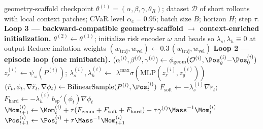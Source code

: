 \begin{algorithm}[t]
\caption{Context-aware continual Hamiltonian learning (training; Loops 2 \& 3)}
\label{alg:ctx_train}
\begin{algorithmic}[1]
\Require geometry-scaffold checkpoint $\theta^{(1)} = (\alpha,\beta,\gamma,\theta_R)$;
         dataset $\mathcal{D}$ of short rollouts with local context
         patches; CVaR level $\alpha_c{=}0.95$; batch size $B$;
         horizon $H$; step $\tau$.
\Statex \textbf{Loop 3 — backward-compatible geometry-scaffold $\to$ context-enriched initialization.}
\State $\theta^{(2)} \leftarrow \theta^{(1)}$; initialize risk encoder
        $\omega$ and heads so $\lambda_s, \lambda_h \equiv 0$ at output
\State Reduce imitation weights $(w_{\mathrm{traj}}, w_{\mathrm{vel}})
        \leftarrow 0.3\,(w_{\mathrm{traj}}, w_{\mathrm{vel}})$
  \Statex \hspace{0.7em}\textbf{Loop 2 — episode loop (one minibatch).}
    \State $(\alpha^{(i)},\beta^{(i)},\gamma^{(i)})
            \leftarrow \phi_{\mathrm{geom}}(\mathcal{O}^{(i)},
                       \Pos_g^{(i)}{-}\Pos_0^{(i)})$
    \State $z_r^{(i)} \leftarrow \psi_\omega(P^{(i)})$;\;
           $\lambda_s^{(i)},\lambda_h^{(i)} \leftarrow$
           $\lambda^{\max}\sigma(\text{MLP}(z_r^{(i)}, z_g^{(i)}))$
      \State $(\tilde r_t,\phi_t,\nabla\tilde r_t,\nabla\phi_t)
              \leftarrow \mathrm{BilinearSample}(P^{(i)},\Pos_t^{(i)})$
      \State $F_{\mathrm{soft}} \leftarrow -\lambda_s^{(i)} \nabla\tilde r_t$;\;
             $F_{\mathrm{hard}} \leftarrow -\lambda_h^{(i)}\,
                                          b_{\mathrm{sp}}'(\phi_t) \nabla\phi_t$
      \State $\Mom_{t+1}^{(i)} \leftarrow \Mom_t^{(i)}
              + \tau(F_{\mathrm{geom}} + F_{\mathrm{soft}}
                     + F_{\mathrm{hard}})
              - \tau\gamma^{(i)} \Mass^{-1}\Mom_t^{(i)}$
      \State $\Pos_{t+1}^{(i)} \leftarrow \Pos_t^{(i)} + \tau \Mass^{-1}\Mom_{t+1}^{(i)}$

\end{algorithmic}
\end{algorithm}

